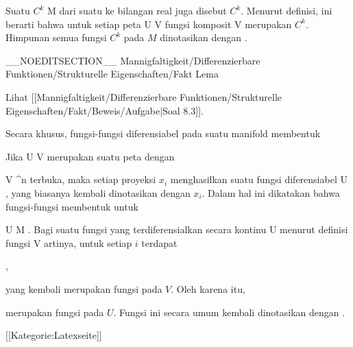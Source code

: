 
Suatu
$C^k$
 {M} {\R
} {}
dari suatu
ke bilangan real juga disebut  {} $C^k$. Menurut definisi, ini berarti bahwa untuk setiap peta
\maabbdisp {\alpha} {U} {V
} {}
fungsi komposit
 {V} {\R
} {}
merupakan
$C^k$. Himpunan semua fungsi $C^k$ pada $M$ dinotasikan dengan
.

__NOEDITSECTION__
{Mannigfaltigkeit/Differenzierbare Funktionen/Strukturelle Eigenschaften/Fakt}
{Lema}
{}
{

\faktzusatz {}
\faktzusatz {}

 }
{ Lihat [[Mannigfaltigkeit/Differenzierbare Funktionen/Strukturelle Eigenschaften/Fakt/Beweis/Aufgabe|Soal 8.3]]. }

Secara khusus, fungsi-fungsi diferensiabel pada suatu manifold membentuk

Jika
\maabbdisp {\alpha} {U} {V
} {}
merupakan suatu peta dengan

\mavergleichskette
{\vergleichskette
{ V
}
{ \subseteq }{ \R^n
}
{  }{
}
{    }{
}
{   }{
}
}
{}{}{}
terbuka, maka setiap proyeksi $x_i$ menghasilkan suatu fungsi diferensiabel
 {U} {\R
} {,}
yang biasanya kembali dinotasikan dengan $x_i$. Dalam hal ini dikatakan bahwa fungsi-fungsi
 membentuk  {} untuk

\mavergleichskette
{\vergleichskette
{ U
}
{ \subseteq }{ M
}
{  }{
}
{    }{
}
{   }{
}
}
{}{}{}
.
Bagi suatu fungsi yang terdiferensialkan secara kontinu
 {U} {\R
} {}
menurut definisi fungsi
 {V} {\R
} {}
artinya, untuk setiap $i$ terdapat

 { , }

yang kembali merupakan fungsi
 {} {}
pada $V$. Oleh karena itu,

 {  }

merupakan fungsi pada $U$. Fungsi ini secara umum kembali dinotasikan dengan
.

 [[Kategorie:Latexseite]]
